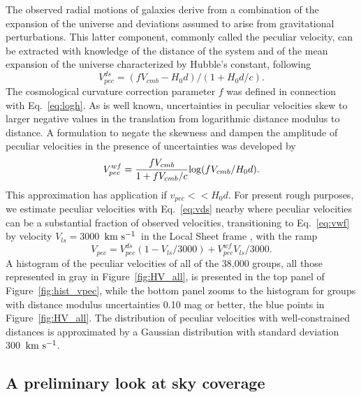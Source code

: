 \documentclass[twocolumn]{aastex63}
\newcommand{\kms}{\mbox{${\rm km~s^{-1}}$}}
\begin{document}
The observed radial motions of galaxies derive from a combination of the expansion of the universe and deviations assumed to arise from gravitational perturbations. This latter component, commonly called the peculiar velocity, can be extracted with knowledge of the distance of the system and of the mean expansion of the universe characterized by Hubble's constant, following 
\citet{2014MNRAS.442.1117D}
\begin{equation}
V_{pec}^{ds} = (fV_{cmb} - H_0 d)/(1 + H_0 d/c) .
\label{eq:vds}
\end{equation}
The cosmological curvature correction parameter $f$ was defined in connection with Eq.~\ref{eq:logh}.
As is well known, uncertainties in peculiar velocities skew to larger negative values in the translation from logarithmic distance modulus to distance.  A formulation to negate the skewness and dampen the amplitude of peculiar velocities in the presence of uncertainties was developed by \citet{2015MNRAS.450.1868W}
\begin{equation}
V_{pec}^{wf} = {{fV_{cmb}}\over{1+fV_{cmb}/c}} {\rm log}(fV_{cmb}/H_0 d) .
    \label{eq:vwf}
\end{equation}
This approximation has application if $v_{pec}<<H_0 d$.  For present rough purposes, we estimate peculiar velocities with Eq.~\ref{eq:vds} nearby where peculiar velocities can be a substantial fraction of observed velocities, transitioning to Eq.~\ref{eq:vwf} by velocity $V_{ls}=3000$~\kms\ in the Local Sheet frame \citep{2008ApJ...676..184T}, with the ramp
\begin{equation}
    V_{pec} = V_{pec}^{ds} (1-V_{ls}/3000) + V_{pec}^{wf} V_{ls}/3000 .
    \label{eq:vramp}
\end{equation}
A histogram of the peculiar velocities of all of the 38,000 groups, all those represented in gray in Figure~\ref{fig:HV_all}, is presented in the top panel of Figure~\ref{fig:hist_vpec}, while the bottom panel zooms to the histogram for groups with distance modulus uncertainties 0.10 mag or better, the blue points in Figure~\ref{fig:HV_all}.  The distribution of peculiar velocities with well-constrained distances is approximated by a Gaussian distribution with standard deviation 300~\kms.



\subsection{A preliminary look at sky coverage}
\label{sec:prelimlook}
\end{document}
